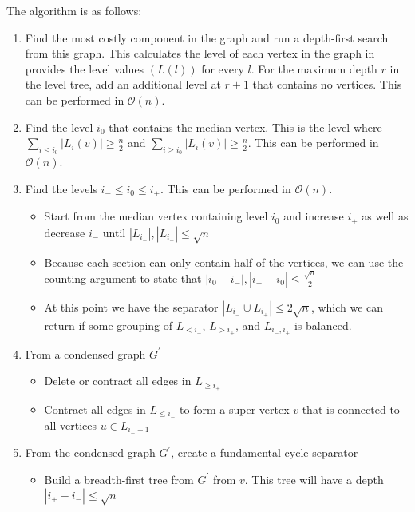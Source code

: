 \documentclass[12pt]{article}
\begin{document}
    The algorithm is as follows:
    \begin{enumerate}

        \item Find the most costly component in the graph and run a depth-first search from this graph. This calculates the level of each vertex in the graph in provides the level values $(L(l))$ for every $l$. For the maximum depth $r$ in the level tree, add an additional level at $r+1$ that contains no vertices. This can be performed in $\mathcal{O}(n)$.

        \item Find the level $i_0$ that contains the median vertex. This is the level where $\sum_{i \leq i_0} |L_i(v)| \geq \frac{n}{2}$ and $\sum_{i \geq i_0} |L_i(v)| \geq \frac{n}{2}$. This can be performed in $\mathcal{O}(n)$.

        \item Find the levels $i_- \leq i_0 \leq i_+$. This can be performed in $\mathcal{O}(n)$.
        \begin{itemize}
            \item Start from the median vertex containing level $i_0$ and increase $i_+$ as well as decrease $i_-$ until $|L_{i_-}|,|L_{i_+}| \leq \sqrt{n}$

            \item Because each section can only contain half of the vertices, we can use the counting argument to state that $|i_0 - i_-|,|i_+ - i_0| \leq \frac{\sqrt{n}}{2}$

            \item At this point we have the separator $|L_{i_-} \cup L_{i_+}| \leq 2 \sqrt{n}$, which we can return if some grouping of $L_{< i_-}$, $L_{> i_+}$, and $L_{i_-,i_+}$ is balanced.
        \end{itemize}

        \item From a condensed graph $G^{'}$
        \begin{itemize}
            \item Delete or contract all edges in $L_{\geq i_+}$

            \item Contract all edges in $L_{\leq i_-}$ to form a super-vertex $v$ that is connected to all vertices $u \in L_{i_- + 1}$
        \end{itemize}


        \item From the condensed graph $G^{'}$, create a fundamental cycle separator
        \begin{itemize}
            \item Build a breadth-first tree from $G^{'}$ from $v$. This tree will have a depth $|i_+ - i_-| \leq \sqrt{n}$


\end{itemize}
\end{enumerate}
\end{document}
